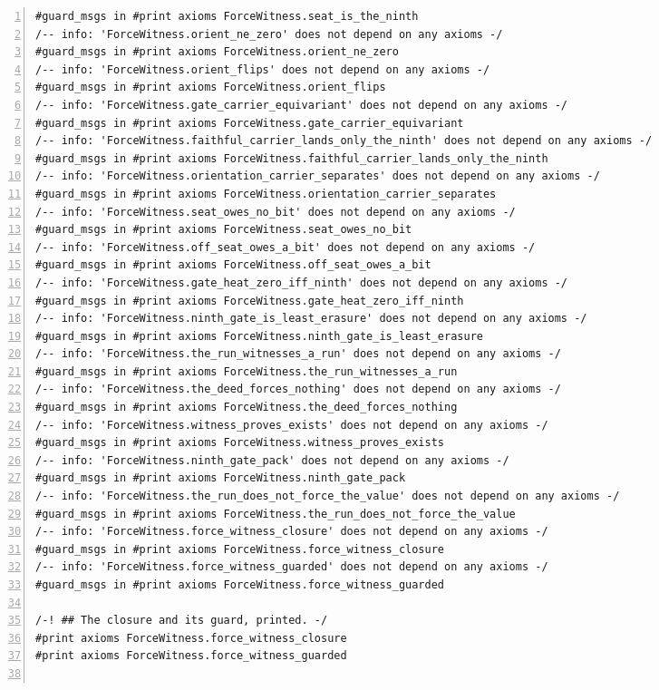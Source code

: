\documentclass[10pt]{article}
\newcommand{\leansize}{\fontsize{5.5pt}{6.75pt}\selectfont}
\begin{document}
\begin{multicols}{2}
\begin{Verbatim}[numbers=left,firstnumber=1,numbersep=3pt,xleftmargin=2.6em,breaklines=true,breakanywhere=true,breakautoindent=false,breakindent=1.4em,breaksymbolleft={},breakanywheresymbolpre={},fontsize=\leansize]
#guard_msgs in #print axioms ForceWitness.seat_is_the_ninth
/-- info: 'ForceWitness.orient_ne_zero' does not depend on any axioms -/
#guard_msgs in #print axioms ForceWitness.orient_ne_zero
/-- info: 'ForceWitness.orient_flips' does not depend on any axioms -/
#guard_msgs in #print axioms ForceWitness.orient_flips
/-- info: 'ForceWitness.gate_carrier_equivariant' does not depend on any axioms -/
#guard_msgs in #print axioms ForceWitness.gate_carrier_equivariant
/-- info: 'ForceWitness.faithful_carrier_lands_only_the_ninth' does not depend on any axioms -/
#guard_msgs in #print axioms ForceWitness.faithful_carrier_lands_only_the_ninth
/-- info: 'ForceWitness.orientation_carrier_separates' does not depend on any axioms -/
#guard_msgs in #print axioms ForceWitness.orientation_carrier_separates
/-- info: 'ForceWitness.seat_owes_no_bit' does not depend on any axioms -/
#guard_msgs in #print axioms ForceWitness.seat_owes_no_bit
/-- info: 'ForceWitness.off_seat_owes_a_bit' does not depend on any axioms -/
#guard_msgs in #print axioms ForceWitness.off_seat_owes_a_bit
/-- info: 'ForceWitness.gate_heat_zero_iff_ninth' does not depend on any axioms -/
#guard_msgs in #print axioms ForceWitness.gate_heat_zero_iff_ninth
/-- info: 'ForceWitness.ninth_gate_is_least_erasure' does not depend on any axioms -/
#guard_msgs in #print axioms ForceWitness.ninth_gate_is_least_erasure
/-- info: 'ForceWitness.the_run_witnesses_a_run' does not depend on any axioms -/
#guard_msgs in #print axioms ForceWitness.the_run_witnesses_a_run
/-- info: 'ForceWitness.the_deed_forces_nothing' does not depend on any axioms -/
#guard_msgs in #print axioms ForceWitness.the_deed_forces_nothing
/-- info: 'ForceWitness.witness_proves_exists' does not depend on any axioms -/
#guard_msgs in #print axioms ForceWitness.witness_proves_exists
/-- info: 'ForceWitness.ninth_gate_pack' does not depend on any axioms -/
#guard_msgs in #print axioms ForceWitness.ninth_gate_pack
/-- info: 'ForceWitness.the_run_does_not_force_the_value' does not depend on any axioms -/
#guard_msgs in #print axioms ForceWitness.the_run_does_not_force_the_value
/-- info: 'ForceWitness.force_witness_closure' does not depend on any axioms -/
#guard_msgs in #print axioms ForceWitness.force_witness_closure
/-- info: 'ForceWitness.force_witness_guarded' does not depend on any axioms -/
#guard_msgs in #print axioms ForceWitness.force_witness_guarded

/-! ## The closure and its guard, printed. -/
#print axioms ForceWitness.force_witness_closure
#print axioms ForceWitness.force_witness_guarded


\end{Verbatim}
\end{multicols}
\end{document}
